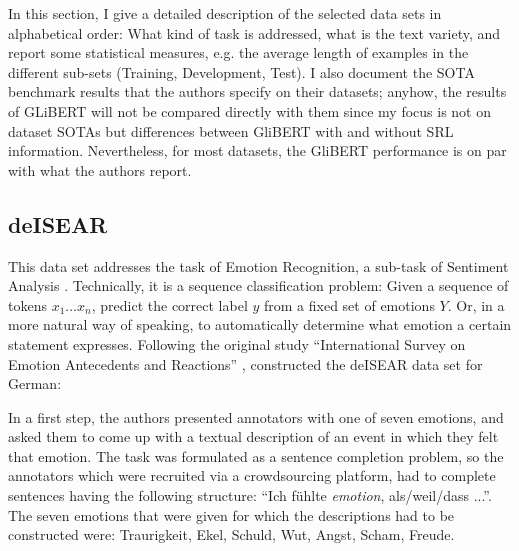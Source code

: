 In this section, I give a detailed description of the selected data sets in alphabetical order:
What kind of task is addressed, what is the text variety, and report some statistical measures,
e.g. the average length of examples in the different sub-sets (Training, Development, Test). I
also document the SOTA benchmark results that the authors specify on their datasets; anyhow,
the results of GLiBERT will not be compared directly with them since my focus is not on dataset
SOTAs but differences between GliBERT with and without SRL information. Nevertheless, for most
datasets, the GliBERT performance is on par with what the authors report.



\subsection{deISEAR}

This data set addresses the task of Emotion Recognition, a sub-task of Sentiment Analysis
\citep{cambria2017affective}. Technically, it is a sequence classification problem: Given a
sequence of tokens $x_1 \dotso x_n$, predict the correct label $y$ from a fixed set of emotions
$Y$. Or, in a more natural way of speaking, to automatically determine what emotion a certain
statement expresses. Following the original study ``International Survey on Emotion Antecedents
and Reactions'' \citep{scherer1994evidence}, \cite{troiano2019crowdsourcing} constructed the
deISEAR data set for German:

In a first step, the authors presented annotators with one of seven emotions, and asked them
to come up with a textual description of an event in which they felt that emotion. The task
was formulated as a sentence completion problem, so the annotators which were recruited via
a crowdsourcing platform, had to complete sentences having the following structure: ``Ich
fühlte \emph{emotion}, als/weil/dass ...''. The seven emotions that were given for which
the descriptions had to be constructed were: Traurigkeit, Ekel, Schuld, Wut, Angst, Scham,
Freude.

